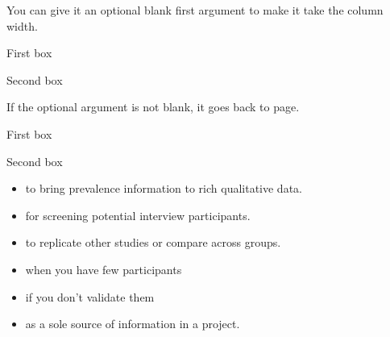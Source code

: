 \documentclass[
  letterpaper, 12pt
]{report}
\begin{document}
You can give it an optional blank first argument to make it take the column width.   
\begin{boxbox}[]{2}
\begin{tcolorbox}First box\end{tcolorbox}
\begin{tcolorbox}[title=second box] Second box \end{tcolorbox}
\end{boxbox}

If the optional argument is not blank, it goes back to page.
\begin{boxbox}[stuff]{2}
\begin{tcolorbox}First box\end{tcolorbox}
\begin{tcolorbox}[title=second box] Second box\end{tcolorbox}
\end{boxbox}

\begin{boxbox}{2}
\begin{tcolorbox}
\begin{itemize}
\item
  to bring prevalence information to rich qualitative data.
\item
  for screening potential interview participants.
\item
  to replicate other studies or compare across groups.
\end{itemize}
\end{tcolorbox}
\begin{tcolorbox}
\begin{itemize}
\item
  when you have few participants
\item
  if you don't validate them
\item
  as a sole source of information in a project.
\end{itemize}
\end{tcolorbox}
\end{boxbox}
\end{document}
